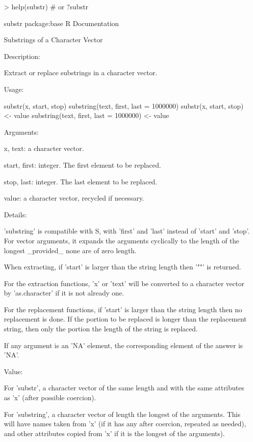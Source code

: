 \documentclass[10pt]{article}\usepackage[]{graphicx}\usepackage[]{color}
\begin{document}
\begin{Soutput}
> help(substr) # or ?substr
\end{Soutput}

\begin{scriptsize}
\begin{Soutput}
substr                 package:base                 R Documentation

Substrings of a Character Vector

Description:

     Extract or replace substrings in a character vector.

Usage:

     substr(x, start, stop)
     substring(text, first, last = 1000000)
     substr(x, start, stop) <- value
     substring(text, first, last = 1000000) <- value

Arguments:

 x, text: a character vector.

start, first: integer. The first element to be replaced.

stop, last: integer. The last element to be replaced.

   value: a character vector, recycled if necessary.

Details:

     'substring' is compatible with S, with 'first' and 'last' instead
     of 'start' and 'stop'. For vector arguments, it expands the
     arguments cyclically to the length of the longest _provided_ none
     are of zero length.

     When extracting, if 'start' is larger than the string length then
     '""' is returned.

     For the extraction functions, 'x' or 'text' will be converted to a
     character vector by 'as.character' if it is not already one.

     For the replacement functions, if 'start' is larger than the
     string length then no replacement is done.  If the portion to be
     replaced is longer than the replacement string, then only the
     portion the length of the string is replaced.

     If any argument is an 'NA' element, the corresponding element of
     the answer is 'NA'.

Value:

     For 'substr', a character vector of the same length and with the
     same attributes as 'x' (after possible coercion).

     For 'substring', a character vector of length the longest of the
     arguments.  This will have names taken from 'x' (if it has any
     after coercion, repeated as needed), and other attributes copied
     from 'x' if it is the longest of the arguments).


\end{Soutput}
\end{scriptsize}
\end{document}
